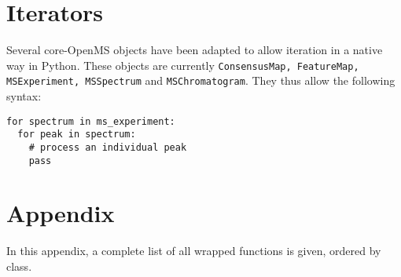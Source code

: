 \documentclass[10pt]{article}
\begin{document}
\section{Iterators}

Several core-OpenMS objects have been adapted to allow iteration in a native
way in Python. These objects are currently \texttt{ConsensusMap, FeatureMap,
MSExperiment, MSSpectrum} and \texttt{MSChromatogram}. They thus allow the
following syntax:

\begin{verbatim}
for spectrum in ms_experiment:
  for peak in spectrum:
    # process an individual peak
    pass
\end{verbatim}

\section{Appendix}
In this appendix, a complete list of all wrapped functions is given, ordered
by class.


\end{document}
